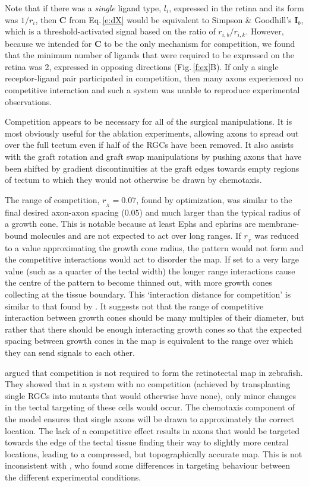 \documentclass[9pt,lineno]{elife}
\begin{document}
Note that if there was a \emph{single} ligand type, $l_i$, expressed in the retina and its form was $1/r_i$, then $\mathbf{C}$ from Eq.\,\ref{e:dX} would be equivalent to Simpson \& Goodhill's $\mathbf{I}_b$, which is a threshold-activated signal based on the ratio of $r_{i,b}/r_{i,k}$. 
However, because we intended for $\mathbf{C}$ to be the only mechanism for competition, we found that the minimum number of ligands that were required to be expressed on the retina was 2, expressed in opposing directions (Fig.\,\ref{f:ex}B). If only a single receptor-ligand pair participated in competition, then many axons experienced no competitive interaction and such a system was unable to reproduce experimental observations.

Competition appears to be necessary for all of the surgical manipulations. 
It is most obviously useful for the ablation experiments, allowing axons to spread out over the full tectum even if half of the RGCs have been removed.
It also assists with the graft rotation and graft swap manipulations by pushing axons that have been shifted by gradient discontinuities at the graft edges towards empty regions of tectum to which they would not otherwise be drawn by chemotaxis.

The range of competition, $r_{\!_X}=0.07$, found by optimization, was similar to the final desired axon-axon spacing ($0.05$) and much larger than the typical radius of a growth cone. This is notable because at least Ephs and ephrins are membrane-bound molecules \citep{cang_developmental_2013} and are not expected to act over long ranges.
If $r_{\!_X}$ was reduced to a value approximating the growth cone radius, the pattern would not form and the competitive interactions would act to disorder the map. 
If set to a very large value (such as a quarter of the tectal width) the longer range interactions cause the centre of the pattern to become thinned out, with more growth cones collecting at the tissue boundary.
This `interaction distance for competition' is similar to that found by \citet{simpson_simple_2011}. 
It suggests not that the range of competitive interaction between growth cones should be many multiples of their diameter, but rather that there should be enough interacting growth cones so that the expected spacing between growth cones in the map is equivalent to the range over which they can send signals to each other.

\citet{gosse_retinotopic_2008} argued that competition is not required to form the retinotectal map in zebrafish. They showed that in a system with no competition (achieved by transplanting single RGCs into mutants that would otherwise have none), only minor changes in the tectal targeting of these cells would occur.
The chemotaxis component of the model ensures that single axons will be drawn to approximately the correct location.
The lack of a competitive effect results in axons that would be targeted towards the edge of the tectal tissue finding their way to slightly more central locations, leading to a compressed, but topographically accurate map.
This is not inconsistent with \citet{gosse_retinotopic_2008}, who found some differences in targeting behaviour between the different experimental conditions.
\end{document}
